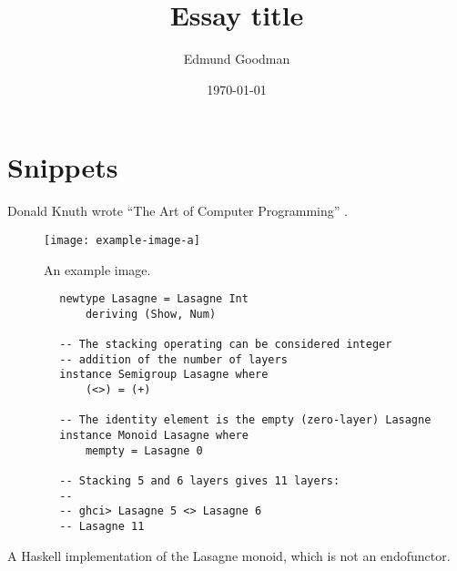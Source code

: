 \documentclass[12pt]{article}
\title{Essay title}
\author{Edmund Goodman}
\date{\today}
\begin{document}
\maketitle



\section{Snippets}
\label{sec:snippets}

Donald Knuth wrote ``The Art of Computer Programming'' \cite{knuth1997art}.

\begin{figure}[H]
    \centering
    \texttt{[image: example-image-a]}
    \caption{An example image.}
    \label{fig:example-image-a}
\end{figure}

\begin{listing}[H]
    \begin{verbatim}
        newtype Lasagne = Lasagne Int
            deriving (Show, Num)

        -- The stacking operating can be considered integer
        -- addition of the number of layers
        instance Semigroup Lasagne where
            (<>) = (+)

        -- The identity element is the empty (zero-layer) Lasagne
        instance Monoid Lasagne where
            mempty = Lasagne 0

        -- Stacking 5 and 6 layers gives 11 layers:
        --
        -- ghci> Lasagne 5 <> Lasagne 6
        -- Lasagne 11
    \end{verbatim}
    \caption{A Haskell implementation of the Lasagne monoid, which is not an endofunctor.}
    \label{listing:haskell-lasagne-monoid}
\end{listing}



\printbibliography[heading=bibnumbered]
\appendix
\end{document}
